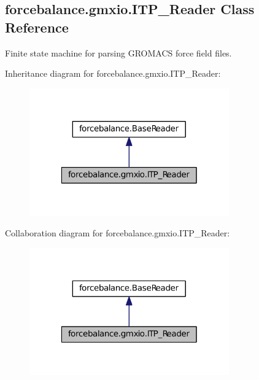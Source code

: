 \hypertarget{classforcebalance_1_1gmxio_1_1ITP__Reader}{\subsection{forcebalance.\-gmxio.\-I\-T\-P\-\_\-\-Reader \-Class \-Reference}
\label{classforcebalance_1_1gmxio_1_1ITP__Reader}
}


\-Finite state machine for parsing \-G\-R\-O\-M\-A\-C\-S force field files.  




\-Inheritance diagram for forcebalance.\-gmxio.\-I\-T\-P\-\_\-\-Reader\-:
\nopagebreak
\begin{figure}[H]
\begin{center}
\leavevmode
\includegraphics[width=244pt]{classforcebalance_1_1gmxio_1_1ITP__Reader__inherit__graph}
\end{center}
\end{figure}


\-Collaboration diagram for forcebalance.\-gmxio.\-I\-T\-P\-\_\-\-Reader\-:
\nopagebreak
\begin{figure}[H]
\begin{center}
\leavevmode
\includegraphics[width=244pt]{classforcebalance_1_1gmxio_1_1ITP__Reader__coll__graph}
\end{center}
\end{figure}

